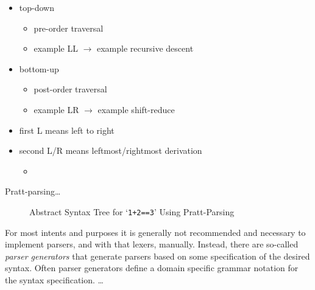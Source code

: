 \begin{itemize}
    \item top-down
    \begin{itemize}
        \item pre-order traversal
        \item example LL $\rightarrow$ example recursive descent
    \end{itemize}
    \item bottom-up
    \begin{itemize}
        \item post-order traversal
        \item example LR $\rightarrow$ example shift-reduce
    \end{itemize}
    \item first L means left to right
    \item second L/R means leftmost/rightmost derivation
    \begin{itemize}
        \item {}
    \end{itemize}
\end{itemize}

Pratt-parsing\ldots
{}

\begin{wrapfigure}{R}{0.5\textwidth}
    \centering
    \caption{Abstract Syntax Tree for `\texttt{1+2==3}' Using Pratt-Parsing}\label{fig:parser_simple_ast_pratt}
\end{wrapfigure}

For most intents and purposes it is generally not recommended and necessary to implement parsers, and with that lexers, manually.
Instead, there are so-called \emph{parser generators} that generate parsers based on some specification of the desired syntax.
Often parser generators define a domain specific grammar notation for the syntax specification.
\ldots
